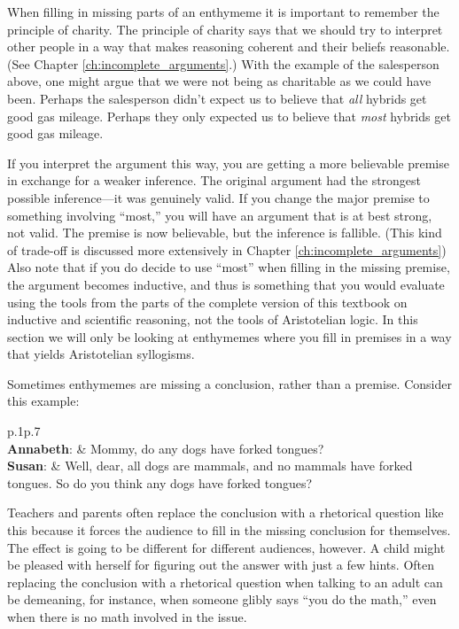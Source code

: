 When filling in missing parts of an enthymeme it is important to remember the principle of charity. The principle of charity says that we should try to interpret other people in a way that makes reasoning coherent and their beliefs reasonable. (See Chapter \ref{ch:incomplete_arguments}.) With the example of the salesperson above, one might argue that we were not being as charitable as we could have been. Perhaps the salesperson didn't expect us to believe that \textit{all} hybrids get good gas mileage. Perhaps they only expected us to believe that \textit{most} hybrids get good gas mileage.

If you interpret the argument this way, you are getting a more believable premise in exchange for a weaker inference. The original argument had the strongest possible inference---it was genuinely valid. If you change the major premise to something involving ``most,'' you will have an argument that is at best strong, not  valid. The premise is now believable, but the inference is fallible.  (This kind of trade-off is discussed more extensively in Chapter \ref{ch:incomplete_arguments}) Also note that if you do decide to use ``most'' when filling in the missing premise, the argument becomes inductive, and thus is something that you would evaluate using the tools from the parts of the complete version of this textbook on inductive and scientific reasoning,  \label{ver_var} not the tools of Aristotelian logic. In this section we will only be looking at enthymemes where you fill in premises in a way that yields Aristotelian syllogisms.

Sometimes enthymemes are missing a conclusion, rather than a premise. Consider this example:

\begin{tabu}{p{.1\linewidth}p{.7\linewidth}}
\\
\textbf{Annabeth}: & Mommy, do any dogs have forked tongues? \\
\textbf{Susan}:  & Well, dear, all dogs are mammals, and no mammals have forked tongues. So do you think any dogs have forked tongues?\\
\end{tabu}

Teachers and parents often replace the conclusion with a rhetorical question like this because it forces the audience to fill in the missing conclusion for themselves. The effect is going to be different for different audiences, however. A child might be pleased with herself for figuring out the answer with just a few hints. Often replacing the conclusion with a rhetorical question when talking to an adult can be demeaning, for instance, when someone glibly says ``you do the math,'' even when there is no math involved in the issue.

